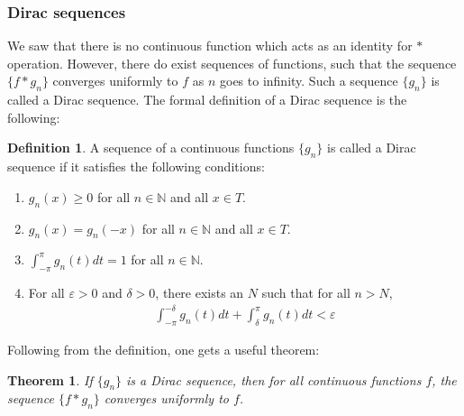 \documentclass[12pt, titlepage]{article}
\newtheorem{thm}{Theorem}[section]
\theoremstyle{definition}
\newtheorem{defn}{Definition}[section]
\newcommand{\vep}{\varepsilon}
\begin{document}

\subsubsection{Dirac sequences}
We saw that there is no continuous function which acts as an identity for $\ast$ operation. However, there do exist sequences of functions, such that the sequence $\{f \ast g_n\}$ converges uniformly to $f$ as $n$ goes to infinity. Such a sequence $\{g_n\}$ is called a Dirac sequence. The formal definition of a Dirac sequence is the following:
\begin{defn}
    A sequence of a continuous functions $\{g_n\}$ is called a Dirac sequence if it satisfies the following conditions:
    \begin{enumerate}
        \item $g_n(x) \geq 0$ for all $n \in \mathbb{N}$ and all $x \in T$.
        \item $g_n(x) = g_n(-x)$ for all $n \in \mathbb{N}$ and all $x \in T$.
        \item $\displaystyle \int_{-\pi}^{\pi} g_n(t) dt = 1$ for all $n \in \mathbb{N}$.
        \item For all $\vep >0$ and $\delta > 0$, there exists an $N$ such that for all $n > N$,
        \begin{align*}
            \int_{-\pi}^{-\delta} g_n(t) dt + \int_{\delta}^{\pi} g_n(t) dt < \vep
        \end{align*}
    \end{enumerate}
\end{defn}
Following from the definition, one gets a useful theorem:
\begin{thm}\label{th:1}
    If $\{g_n\}$ is a Dirac sequence, then for all continuous functions $f$, the sequence $\{f \ast g_n\}$ converges uniformly to $f$.
\end{thm}
\end{document}
